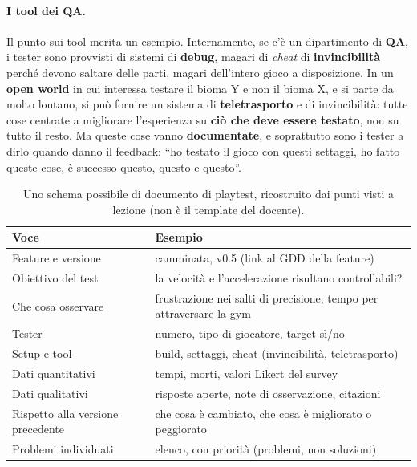 \paragraph{I tool dei QA.} Il punto sui tool merita un esempio. Internamente,
se c'è un dipartimento di \textbf{QA}, i tester sono provvisti di sistemi di
\textbf{debug}, magari di \emph{cheat} di \textbf{invincibilità} perché devono
saltare delle parti, magari dell'intero gioco a disposizione. In un
\textbf{open world} in cui interessa testare il bioma Y e non il bioma X, e
si parte da molto lontano, si può fornire un sistema di
\textbf{teletrasporto} e di invincibilità: tutte cose centrate a migliorare
l'esperienza su \textbf{ciò che deve essere testato}, non su tutto il resto.
Ma queste cose vanno \textbf{documentate}, e soprattutto sono i tester a
dirlo quando danno il feedback: ``ho testato il gioco con questi settaggi, ho
fatto queste cose, è successo questo, questo e questo''.

\begin{table}[htbp]
  \centering
  \caption{Uno schema possibile di documento di playtest, ricostruito dai
  punti visti a lezione (non è il template del docente).}
  \label{gd10:tab:playtest}
  \small
  \begin{tabular}{@{}p{}p{}@{}}
    \toprule
    \textbf{Voce} & \textbf{Esempio} \\
    \midrule
    Feature e versione & camminata, v0.5 (link al GDD della feature) \\
    Obiettivo del test & la velocità e l'accelerazione risultano
      controllabili? \\
    Che cosa osservare & frustrazione nei salti di precisione; tempo per
      attraversare la gym \\
    Tester & numero, tipo di giocatore, target sì/no \\
    Setup e tool & build, settaggi, cheat (invincibilità, teletrasporto) \\
    Dati quantitativi & tempi, morti, valori Likert del survey \\
    Dati qualitativi & risposte aperte, note di osservazione, citazioni \\
    Rispetto alla versione precedente & che cosa è cambiato, che cosa è
      migliorato o peggiorato \\
    Problemi individuati & elenco, con priorità (problemi, non soluzioni) \\
    \bottomrule
  \end{tabular}
\end{table}

